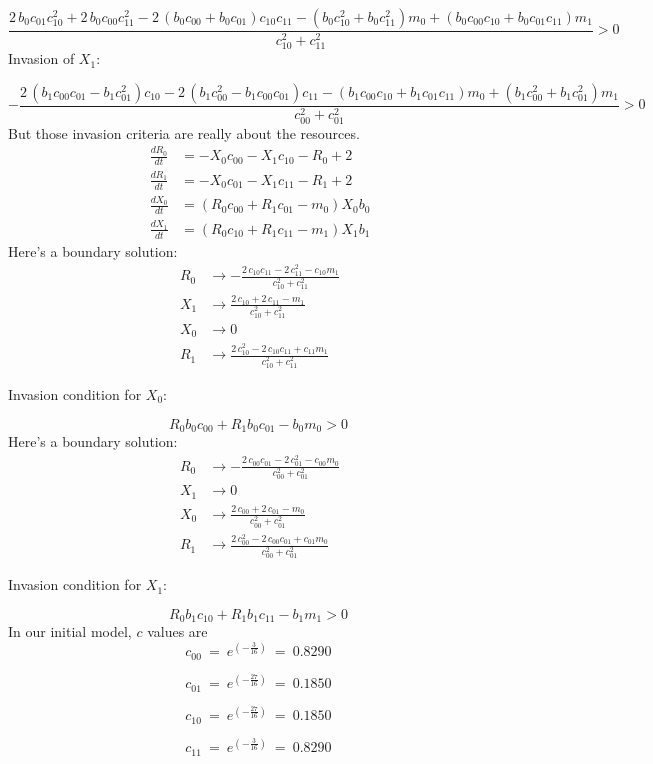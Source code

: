 \documentclass{article}
\begin{document}
\[\frac{2 \, b_{0} c_{01} c_{10}^{2} + 2 \, b_{0} c_{00} c_{11}^{2} - 2 \, {\left(b_{0} c_{00} + b_{0} c_{01}\right)} c_{10} c_{11} - {\left(b_{0} c_{10}^{2} + b_{0} c_{11}^{2}\right)} m_{0} + {\left(b_{0} c_{00} c_{10} + b_{0} c_{01} c_{11}\right)} m_{1}}{c_{10}^{2} + c_{11}^{2}} > 0 \
\]
Invasion of $X_{1}$:

\[-\frac{2 \, {\left(b_{1} c_{00} c_{01} - b_{1} c_{01}^{2}\right)} c_{10} - 2 \, {\left(b_{1} c_{00}^{2} - b_{1} c_{00} c_{01}\right)} c_{11} - {\left(b_{1} c_{00} c_{10} + b_{1} c_{01} c_{11}\right)} m_{0} + {\left(b_{1} c_{00}^{2} + b_{1} c_{01}^{2}\right)} m_{1}}{c_{00}^{2} + c_{01}^{2}} > 0 \
\]
But those invasion criteria are really about the resources.
\begin{align*}
\frac{dR_{0}}{dt} &= -X_{0} c_{00} - X_{1} c_{10} - R_{0} + 2\\
\frac{dR_{1}}{dt} &= -X_{0} c_{01} - X_{1} c_{11} - R_{1} + 2\\
\frac{dX_{0}}{dt} &= {\left(R_{0} c_{00} + R_{1} c_{01} - m_{0}\right)} X_{0} b_{0}\\
\frac{dX_{1}}{dt} &= {\left(R_{0} c_{10} + R_{1} c_{11} - m_{1}\right)} X_{1} b_{1}
\end{align*}Here's a boundary solution: \begin{align*}
  R_{0} &\to -\frac{2 \, c_{10} c_{11} - 2 \, c_{11}^{2} - c_{10} m_{1}}{c_{10}^{2} + c_{11}^{2}} \\
  X_{1} &\to \frac{2 \, c_{10} + 2 \, c_{11} - m_{1}}{c_{10}^{2} + c_{11}^{2}} \\
  X_{0} &\to 0 \\
  R_{1} &\to \frac{2 \, c_{10}^{2} - 2 \, c_{10} c_{11} + c_{11} m_{1}}{c_{10}^{2} + c_{11}^{2}}
\end{align*}

Invasion condition for $X_{0}$:

\[R_{0} b_{0} c_{00} + R_{1} b_{0} c_{01} - b_{0} m_{0} > 0 \
\]
Here's a boundary solution: \begin{align*}
  R_{0} &\to -\frac{2 \, c_{00} c_{01} - 2 \, c_{01}^{2} - c_{00} m_{0}}{c_{00}^{2} + c_{01}^{2}} \\
  X_{1} &\to 0 \\
  X_{0} &\to \frac{2 \, c_{00} + 2 \, c_{01} - m_{0}}{c_{00}^{2} + c_{01}^{2}} \\
  R_{1} &\to \frac{2 \, c_{00}^{2} - 2 \, c_{00} c_{01} + c_{01} m_{0}}{c_{00}^{2} + c_{01}^{2}}
\end{align*}

Invasion condition for $X_{1}$:

\[R_{0} b_{1} c_{10} + R_{1} b_{1} c_{11} - b_{1} m_{1} > 0 \
\]
In our initial model, $c$ values are
\[c_{00} \
=\
e^{\left(-\frac{3}{16}\right)} \
=\
0.8290 \
\]

\[c_{01} \
=\
e^{\left(-\frac{27}{16}\right)} \
=\
0.1850 \
\]

\[c_{10} \
=\
e^{\left(-\frac{27}{16}\right)} \
=\
0.1850 \
\]

\[c_{11} \
=\
e^{\left(-\frac{3}{16}\right)} \
=\
0.8290 \
\]
\end{document}
